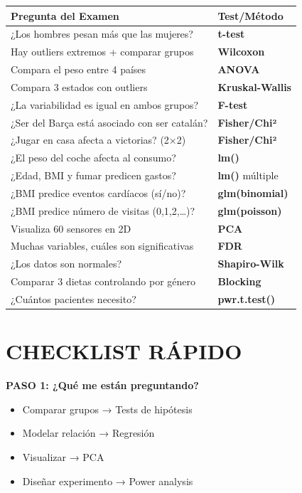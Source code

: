 \documentclass[
  10pt,
]{article}
\providecommand{\tightlist}{%
  \setlength{\itemsep}{0pt}\setlength{\parskip}{0pt}}
\begin{document}
\begin{longtable}[]{@{}ll@{}}
\toprule\noalign{}
Pregunta del Examen & Test/Método \\
\midrule\noalign{}
\endhead
\bottomrule\noalign{}
\endlastfoot
¿Los hombres pesan más que las mujeres? & \textbf{t-test} \\
Hay outliers extremos + comparar grupos & \textbf{Wilcoxon} \\
Compara el peso entre 4 países & \textbf{ANOVA} \\
Compara 3 estados con outliers & \textbf{Kruskal-Wallis} \\
¿La variabilidad es igual en ambos grupos? & \textbf{F-test} \\
¿Ser del Barça está asociado con ser catalán? & \textbf{Fisher/Chi²} \\
¿Jugar en casa afecta a victorias? (2×2) & \textbf{Fisher/Chi²} \\
¿El peso del coche afecta al consumo? & \textbf{lm()} \\
¿Edad, BMI y fumar predicen gastos? & \textbf{lm()} múltiple \\
¿BMI predice eventos cardíacos (sí/no)? & \textbf{glm(binomial)} \\
¿BMI predice número de visitas (0,1,2,\ldots)? &
\textbf{glm(poisson)} \\
Visualiza 60 sensores en 2D & \textbf{PCA} \\
Muchas variables, cuáles son significativas & \textbf{FDR} \\
¿Los datos son normales? & \textbf{Shapiro-Wilk} \\
Comparar 3 dietas controlando por género & \textbf{Blocking} \\
¿Cuántos pacientes necesito? & \textbf{pwr.t.test()} \\
\end{longtable}

\section{CHECKLIST RÁPIDO}\label{checklist-ruxe1pido}

\textbf{PASO 1: ¿Qué me están preguntando?}

\begin{itemize}
\tightlist
\item[$\square$]
  Comparar grupos → Tests de hipótesis
\item[$\square$]
  Modelar relación → Regresión
\item[$\square$]
  Visualizar → PCA
\item[$\square$]
  Diseñar experimento → Power analysis
\end{itemize}
\end{document}
